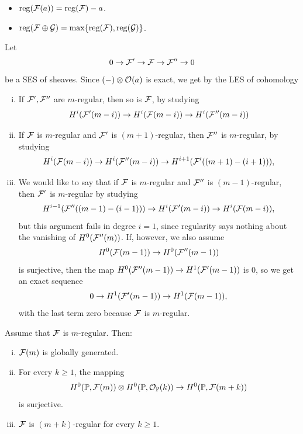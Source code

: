 \documentclass[12pt]{article}
\newcommand{\reg}{\mathrm{reg}}
\begin{document}
\begin{eg}
    \begin{itemize}
        \item $\reg(\cF(a)) = \reg(\cF) - a$.
        \item $\reg(\cF \oplus \cG) = \max\{\reg(\cF), \reg(\cG)\}$.
    \end{itemize}
\end{eg}

\begin{eg}
    Let
    \[0\to \mathcal{F}' \to \mathcal{F} \to \mathcal{F}'' \to 0\]
    be a SES of sheaves. Since $(-) \otimes \mathcal{O}(a)$ is exact, we get by the LES of cohomology
    \begin{enumerate}[(i)]
        \item If $\mathcal{F}',\mathcal{F}''$ are $m$-regular, then so is $\mathcal{F}$, by studying
        \[H^i(\mathcal{F}'(m-i)) \to H^i(\mathcal{F}(m-i)) \to H^i(\mathcal{F}''(m-i))\]
        \item If $\mathcal{F}$ is $m$-regular and $\mathcal{F}'$ is $(m+1)$-regular, then $\mathcal{F}''$ is $m$-regular, by studying
        \[H^i(\mathcal{F}(m-i)) \to H^i(\mathcal{F}''(m-i)) \to H^{i+1}(\mathcal{F}'((m+1)-(i+1))),\]
        \item We would like to say that if $\mathcal{F}$ is $m$-regular and $\mathcal{F}''$ is $(m-1)$-regular, then $\mathcal{F}'$ is $m$-regular by studying
        \[H^{i-1}(\mathcal{F}''((m-1)-(i-1))) \to H^i(\mathcal{F}'(m-i)) \to H^i(\mathcal{F}(m-i)),\]
        but this argument fails in degree $i=1$, since regularity says nothing about the vanishing of $H^0(\mathcal{F}''(m))$. If, however, we also assume
        \[H^0(\mathcal{F}(m-1)) \to H^0(\mathcal{F}''(m-1))\]
        is surjective, then the map $H^0(\mathcal{F}''(m-1))\to H^1(\mathcal{F}'(m-1))$ is 0, so we get an exact sequence
        \[0 \to H^1(\mathcal{F}'(m-1)) \to H^1(\mathcal{F}(m-1)),\]
        with the last term zero because $\mathcal{F}$ is $m$-regular.
    \end{enumerate}
\end{eg}

\begin{thm}[Mumford]
    Assume that $\mathcal{F}$ is $m$-regular. Then:
    \begin{enumerate}[(i)]
        \item $\mathcal{F}(m)$ is globally generated.
        \item For every $k\geq 1$, the mapping
        \[H^0(\mathbb{P},\mathcal{F}(m)) \otimes H^0(\mathbb{P}, \mathcal{O}_{\mathbb{P}}(k)) \to H^0(\mathbb{P},\mathcal{F}(m+k))\]
        is surjective.
        \item $\mathcal{F}$ is $(m+k)$-regular for every $k\geq 1$.
    \end{enumerate}
\end{thm}
\end{document}
